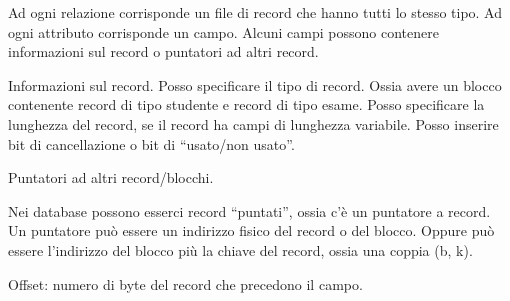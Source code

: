 Ad ogni relazione corrisponde un file di record che hanno tutti lo stesso tipo. Ad ogni attributo corrisponde un campo. Alcuni campi possono contenere informazioni sul record o puntatori ad altri record.

Informazioni sul record. Posso specificare il tipo di record. Ossia avere un blocco contenente record di tipo studente e record di tipo esame. Posso specificare la lunghezza del record, se il record ha campi di lunghezza variabile. Posso inserire bit di cancellazione o bit di ``usato/non usato''.

Puntatori ad altri record/blocchi.

Nei database possono esserci record ``puntati'', ossia c'\`e un puntatore a record. Un puntatore pu\`o essere un indirizzo fisico del record o del blocco. Oppure pu\`o essere l'indirizzo del blocco pi\`u la chiave del record, ossia una coppia (b, k).

Offset: numero di byte del record che precedono il campo.